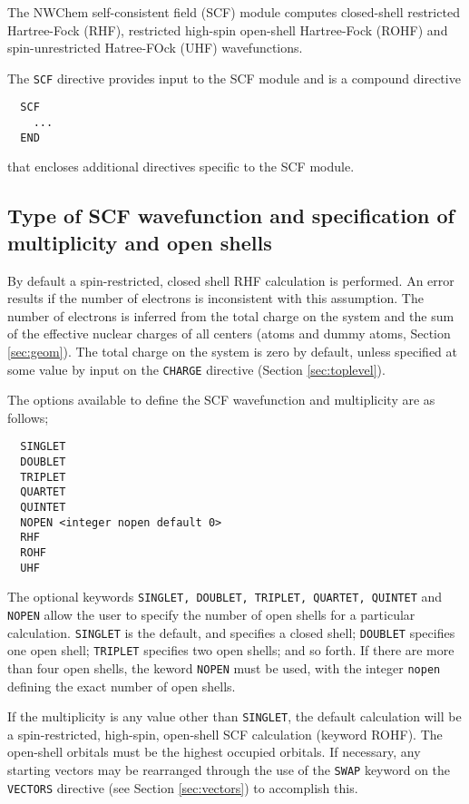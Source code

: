 \label{sec:scf}

The NWChem self-consistent field (SCF) module computes closed-shell
restricted Hartree-Fock (RHF), restricted high-spin open-shell
Hartree-Fock (ROHF) and spin-unrestricted Hatree-FOck (UHF)
wavefunctions. 

The \verb+SCF+ directive provides input to the SCF module
and is a compound directive
\begin{verbatim}
  SCF
    ...
  END
\end{verbatim}
that encloses additional directives specific to the SCF module. 

\subsection{Type of SCF wavefunction and specification of multiplicity
and open shells}

By default a spin-restricted, closed shell RHF calculation is
performed.  An error results if the number of electrons is
inconsistent with this assumption.  The number of electrons is
inferred from the total charge on the system and the sum of the
effective nuclear charges of all centers (atoms and dummy atoms,
Section \ref{sec:geom}).  The total charge on the system is zero by
default, unless specified at some value by input on the \verb+CHARGE+
directive (Section \ref{sec:toplevel}).

The options available to define the SCF wavefunction and multiplicity
are as follows;

\begin{verbatim}
  SINGLET 
  DOUBLET 
  TRIPLET 
  QUARTET 
  QUINTET 
  NOPEN <integer nopen default 0>
  RHF
  ROHF
  UHF
\end{verbatim}

The optional keywords \verb+SINGLET, DOUBLET, TRIPLET, QUARTET, QUINTET+ 
and \verb+NOPEN+ allow the user to specify the number of open shells for a 
particular calculation.  \verb+SINGLET+ is the default, and specifies a 
closed shell; \verb+DOUBLET+ specifies one open shell; \verb+TRIPLET+
specifies two open shells; and so forth.  If there are more than four
open shells, the keword \verb+NOPEN+ must be used, with the integer
\verb+nopen+ defining the exact number of open shells.

If the multiplicity is any value other than \verb+SINGLET+, the
default calculation will be a spin-restricted, high-spin, open-shell
SCF calculation (keyword ROHF).  The open-shell orbitals must be the
highest occupied orbitals.  If necessary, any starting vectors may be
rearranged through the use of the \verb+SWAP+ keyword on the
\verb+VECTORS+ directive (see Section \ref{sec:vectors}) to accomplish
this.


